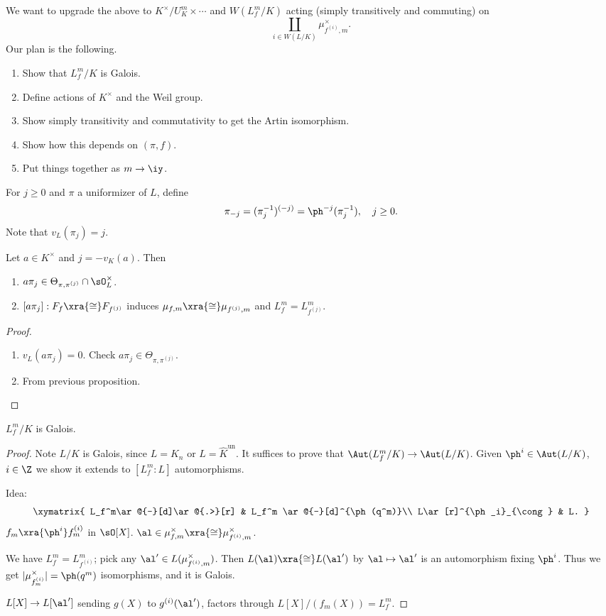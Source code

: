 We want to upgrade the above to $K^{\times}/U_K^m\times \cdots$ and $W(L_f^m/K)$ acting (simply transitively and commuting) on 
\[
\coprod_{i\in W(L/K)}\mu^{\times}_{f^{(i)},m}.
\]
Our plan is the following.
\begin{enumerate}
\item
Show that $L_f^m/K$ is Galois.
\item
Define actions of $K^{\times}$ and the Weil group.
\item
Show simply transitivity and commutativity to get the Artin isomorphism.
\item
Show how this depends on $(\pi, f)$.
\item
Put things together as $m\to \iy$.
\end{enumerate}
\begin{df}
For $j\ge 0$ and $\pi$ a uniformizer of $L$, define
\[
\pi_{-j}=(\pi_j^{-1})^{(-j)}=\ph^{-j}(\pi_j^{-1}),\quad j\ge 0.
\]
Note that $v_L(\pi_j)=j$.
\end{df}
\begin{lem}
Let $a\in K^{\times}$ and $j=-v_K(a)$. Then
\begin{enumerate}
\item
$a\pi_j\in \Theta_{\pi,\pi^{(j)}}\cap \sO_L^{\times}$.
\item
$[a\pi_j]: F_f\xra{\cong} F_{f^{(j)}}$ induces $\mu_{f,m}\xra{\cong}\mu_{f^{(j)},m}$ and $L_f^m=L_{f^{(j)}}^m$.
\end{enumerate}
\end{lem}
\begin{proof}
\begin{enumerate}
\item
$v_L(a\pi_j)=0$. Check $a\pi_j\in \Theta_{\pi,\pi^{(j)}}$.
\item
From previous proposition.
\end{enumerate}
\end{proof}
\begin{pr}
$L_f^m/K$ is Galois.
\end{pr}
\begin{proof}
Note $L/K$ is Galois, since $L=K_n$ or $L=\hat{K}^{\text{un}}$.
It suffices to prove that $\Aut(L_f^m/K)\to \Aut(L/K)$. Given $\ph^i\in \Aut(L/K)$, $i\in\Z$ we show it extends to $[L_f^m:L]$ automorphisms.

Idea: %
\[
\xymatrix{
L_f^m\ar@{-}[d]\ar@{.>}[r] & L_f^m \ar@{-}[d]^{\ph(q^m)}\\
L\ar[r]^{\ph_i}_{\cong} & L.
}
\]
$f_m\xra{\ph^i}f_m^{(i)}$ in $\sO[X]$. $\al\in \mu_{f,m}^{\times} \xra{\cong} \mu^{\times}_{f^{(i)},m}$.

We have $L_f^m=L_{f^{(i)}}^m$; pick any $\al'\in L(\mu_{f^{(i)},m}^{\times})$. Then $L(\al)\xra{\cong} L(\al')$ by $\al\mapsto \al'$ is an automorphism fixing $\ph^i$.
Thus we get $|\mu_{f^{(i)}_m}^{\times}|=\ph(q^m)$ isomorphisms, and it is Galois.

$L[X]\to L[\al']$ sending $g(X)$ to $g^{(i)}(\al')$, factors through $L[X]/(f_m(X))=L_f^m$.
\end{proof}
